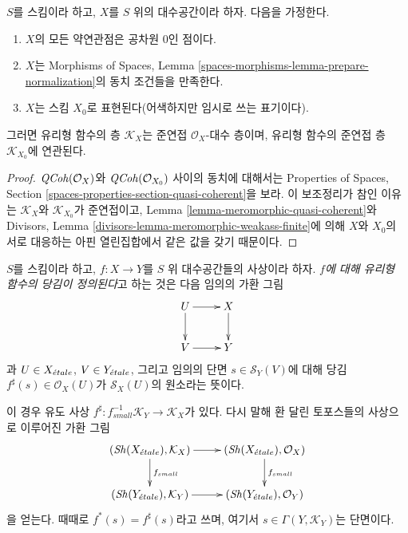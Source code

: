 \begin{lemma}
\label{lemma-meromorphic-quasi-coherent-agree}
$S$를 스킴이라 하고, $X$를 $S$ 위의 대수공간이라 하자. 다음을 가정한다.
\begin{enumerate}
\item[(a)] $X$의 모든 약연관점은 공차원 $0$인 점이다.
\item[(b)] $X$는 Morphisms of Spaces, Lemma
\ref{spaces-morphisms-lemma-prepare-normalization}의 동치 조건들을 만족한다.
\item[(c)] $X$는 스킴 $X_0$로 표현된다(어색하지만 임시로 쓰는 표기이다).
\end{enumerate}
그러면 유리형 함수의 층 $\mathcal{K}_X$는 준연접
$\mathcal{O}_X$-대수 층이며, 유리형 함수의 준연접 층
$\mathcal{K}_{X_0}$에 연관된다.
\end{lemma}

\begin{proof}
$\mathit{QCoh}(\mathcal{O}_X)$와 $\mathit{QCoh}(\mathcal{O}_{X_0})$ 사이의 동치에 대해서는
Properties of Spaces, Section
\ref{spaces-properties-section-quasi-coherent}을 보라. 이 보조정리가 참인
이유는 $\mathcal{K}_X$와 $\mathcal{K}_{X_0}$가 준연접이고, Lemma
\ref{lemma-meromorphic-quasi-coherent}와 Divisors, Lemma
\ref{divisors-lemma-meromorphic-weakass-finite}에 의해 $X$와 $X_0$의
서로 대응하는 아핀 열린집합에서 같은 값을 갖기 때문이다.
\end{proof}

\begin{definition}
\label{definition-pullback-meromorphic-sections}
$S$를 스킴이라 하고, $f : X \to Y$를 $S$ 위 대수공간들의 사상이라 하자.
{\it $f$에 대해 유리형 함수의 당김이 정의된다}고 하는 것은 다음 임의의
가환 그림
$$
\xymatrix{
U \ar[r] \ar[d] & X \ar[d] \\
V \ar[r] & Y
}
$$
과 $U \in X_{\acute{e}tale}$, $V \in Y_{\acute{e}tale}$, 그리고 임의의 단면
$s \in \mathcal{S}_Y(V)$에 대해 당김
$f^\sharp(s) \in \mathcal{O}_X(U)$가 $\mathcal{S}_X(U)$의 원소라는 뜻이다.
\end{definition}

\noindent
이 경우 유도 사상
$f^\sharp : f_{small}^{-1}\mathcal{K}_Y \to \mathcal{K}_X$가 있다.
다시 말해 환 달린 토포스들의 사상으로 이루어진 가환 그림
$$
\xymatrix{
(\Sh(X_\etale), \mathcal{K}_X) \ar[r] \ar[d]^{f_{small}} &
(\Sh(X_\etale), \mathcal{O}_X) \ar[d]^{f_{small}} \\
(\Sh(Y_\etale), \mathcal{K}_Y) \ar[r] &
(\Sh(Y_\etale), \mathcal{O}_Y)
}
$$
을 얻는다. 때때로 $f^*(s) = f^\sharp(s)$라고 쓰며, 여기서
$s \in \Gamma(Y, \mathcal{K}_Y)$는 단면이다.


